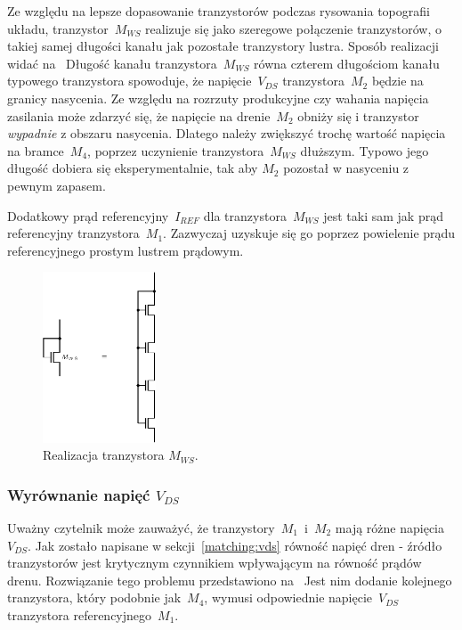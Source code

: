 \documentclass[twoside,pl,final]{labman}
\begin{document}
Ze względu na lepsze dopasowanie tranzystorów podczas
rysowania topografii układu,
tranzystor~$M_{WS}$ realizuje się jako szeregowe połączenie tranzystorów,
o takiej samej długości kanału jak pozostałe tranzystory lustra.
Sposób realizacji widać na~
Długość kanału tranzystora~$M_{WS}$ równa czterem długościom
kanału typowego tranzystora spowoduje,
że napięcie~$V_{DS}$ tranzystora~$M_2$ będzie na granicy nasycenia.
Ze względu na rozrzuty produkcyjne czy wahania napięcia zasilania
może zdarzyć się, że napięcie na drenie~$M_2$ obniży się i tranzystor
\emph{wypadnie} z obszaru nasycenia.
Dlatego należy zwiększyć trochę wartość napięcia na bramce~$M_4$,
poprzez uczynienie tranzystora~$M_{WS}$ dłuższym.
Typowo jego długość dobiera się eksperymentalnie,
tak aby $M_2$ pozostał w nasyceniu z pewnym zapasem.

Dodatkowy prąd referencyjny~$I_{REF}$ dla tranzystora~$M_{WS}$
jest taki sam jak prąd referencyjny tranzystora~$M_1$.
Zazwyczaj uzyskuje się go poprzez powielenie prądu referencyjnego
prostym lustrem prądowym.

\begin{figure}[!htbp]
  \centering
  \includegraphics[width=0.3\textwidth]{cascode_mws}
  \caption{Realizacja tranzystora $M_{WS}$.}
  \label{fig:cascode:wideswing:mws}
\end{figure}

\subsubsection{Wyrównanie napięć $V_{DS}$}
\label{cascode:wideswing:vds}

Uważny czytelnik może zauważyć, że tranzystory~$M_1$~i~$M_2$
mają różne napięcia~$V_{DS}$.
Jak zostało napisane w sekcji~\ref{matching:vds}
równość napięć dren - źródło tranzystorów jest krytycznym czynnikiem
wpływającym na równość prądów drenu.
Rozwiązanie tego problemu przedstawiono na~
Jest nim dodanie kolejnego tranzystora, który podobnie jak~$M_4$,
wymusi odpowiednie napięcie~$V_{DS}$ tranzystora referencyjnego~$M_1$.
\end{document}
